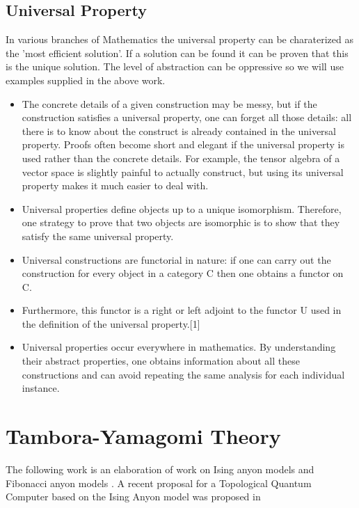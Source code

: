 \documentclass[preprint, 5p, 10pt]{elsarticle}
\theoremstyle{plain}
\begin{document}
\subsection{Universal Property}\label{Universal}
In various branches of Mathematics the universal property can be charaterized as the 'most efficient solution'.
If a solution can be found it can be proven that this is the unique solution. 
The level of abstraction can be oppressive so we will use examples supplied in the above work.
\begin{itemize}
 \item 
 
The concrete details of a given construction may be messy, but if the construction satisfies a universal property, one can forget all those details: all there is to know about the construct is already contained in the universal property. Proofs often become short and elegant if the universal property is used rather than the concrete details. For example, the tensor algebra of a vector space is slightly painful to actually construct, but using its universal property makes it much easier to deal with.
\item Universal properties define objects up to a unique isomorphism. Therefore, one strategy to prove that two objects are isomorphic is to show that they satisfy the same universal property.
\item Universal constructions are functorial in nature: if one can carry out the construction for every object in a category C then one obtains a functor on C.
 \item Furthermore, this functor is a right or left adjoint to the functor U used in the definition of the universal property.[1]
\item Universal properties occur everywhere in mathematics. By understanding their abstract properties, one obtains information about all these constructions and can avoid repeating the same analysis for each individual instance.
\end{itemize}
\cite{MeasureTheory}
\section{Tambora-Yamagomi Theory}
The following work is an elaboration of work on Ising anyon models \cite{Bomin2010PhRvL.105c0403B_IsingAnyons} and Fibonacci anyon models 
\cite{2007PhDT.......224H}. A recent proposal for a Topological Quantum Computer based on the Ising Anyon model was proposed in \cite{Blueprint_TQC_2010}
\end{document}
